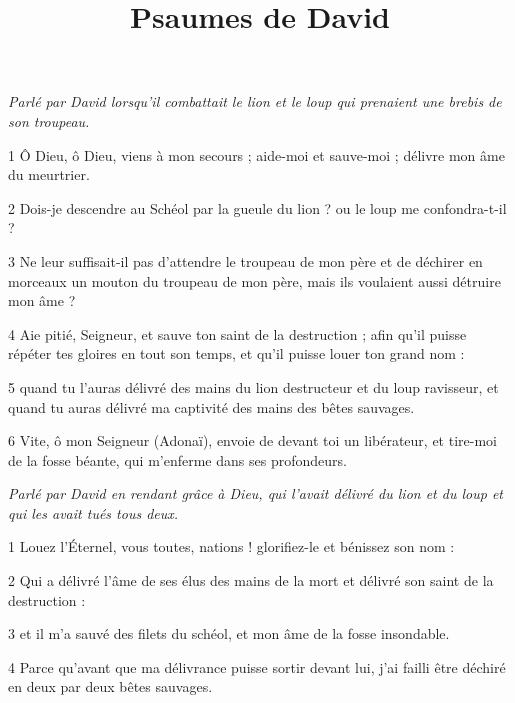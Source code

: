 

\title{Psaumes de David}


\par \textit{Parlé par David lorsqu'il combattait le lion et le loup qui prenaient une brebis de son troupeau.}

\par 1 Ô Dieu, ô Dieu, viens à mon secours ; aide-moi et sauve-moi ; délivre mon âme du meurtrier.

\par 2 Dois-je descendre au Schéol par la gueule du lion ? ou le loup me confondra-t-il ?

\par 3 Ne leur suffisait-il pas d'attendre le troupeau de mon père et de déchirer en morceaux un mouton du troupeau de mon père, mais ils voulaient aussi détruire mon âme ?

\par 4 Aie pitié, Seigneur, et sauve ton saint de la destruction ; afin qu'il puisse répéter tes gloires en tout son temps, et qu'il puisse louer ton grand nom :

\par 5 quand tu l'auras délivré des mains du lion destructeur et du loup ravisseur, et quand tu auras délivré ma captivité des mains des bêtes sauvages.

\par 6 Vite, ô mon Seigneur (Adonaï), envoie de devant toi un libérateur, et tire-moi de la fosse béante, qui m'enferme dans ses profondeurs.


\par \textit{Parlé par David en rendant grâce à Dieu, qui l'avait délivré du lion et du loup et qui les avait tués tous deux.}

\par 1 Louez l'Éternel, vous toutes, nations ! glorifiez-le et bénissez son nom :

\par 2 Qui a délivré l'âme de ses élus des mains de la mort et délivré son saint de la destruction :

\par 3 et il m'a sauvé des filets du schéol, et mon âme de la fosse insondable.

\par 4 Parce qu'avant que ma délivrance puisse sortir devant lui, j'ai failli être déchiré en deux par deux bêtes sauvages.

